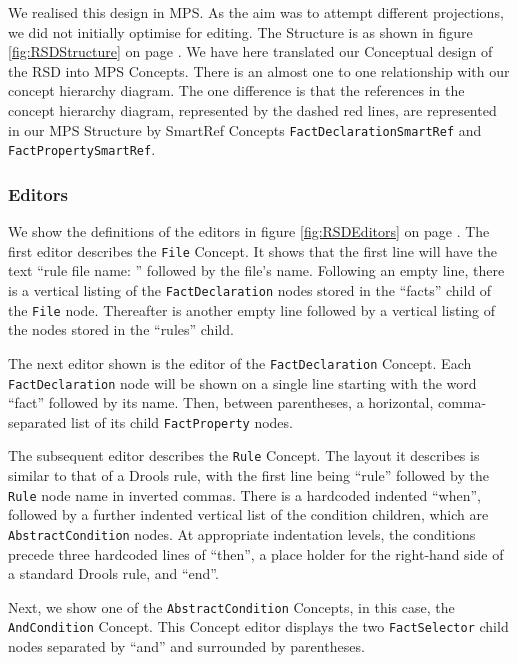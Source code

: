 We realised this design in MPS.
As the aim was to attempt different projections, we did not initially optimise for editing.
The Structure is as shown in figure \ref{fig:RSDStructure} on page \pageref{fig:RSDStructure}.
We have here translated our Conceptual design of the RSD into MPS Concepts.
There is an almost one to one relationship with our concept hierarchy diagram.
The one difference is that the references in the concept hierarchy diagram, represented by the dashed red lines, are represented in our MPS Structure by SmartRef Concepts \texttt{FactDeclarationSmartRef} and \texttt{FactPropertySmartRef}.


\subsubsection{Editors}

We show the definitions of the editors in figure \ref{fig:RSDEditors} on page \pageref{fig:RSDEditors}. 
The first editor describes the \texttt{File} Concept. 
It shows that the first line will have the text ``rule file name: '' followed by the file's name.
Following an empty line, there is a vertical listing of the \texttt{FactDeclaration} nodes stored in the ``facts'' child of the \texttt{File} node.
Thereafter is another empty line followed by a vertical listing of the  nodes stored in the ``rules'' child.

The next editor shown is the editor of the \texttt{FactDeclaration} Concept.
Each \texttt{FactDeclaration} node will be shown on a single line starting with the word ``fact'' followed by its name.
Then, between parentheses, a horizontal, comma-separated list of its child \texttt{FactProperty} nodes.

The subsequent editor describes the \texttt{Rule} Concept. 
The layout it describes is similar to that of a Drools rule, with the first line being ``rule'' followed by the \texttt{Rule} node name in inverted commas.
There is a hardcoded indented ``when'', followed by a further indented vertical list of the condition children, which are \linebreak\texttt{AbstractCondition} nodes.
At appropriate indentation levels, the conditions precede three hardcoded lines of ``then'', a place holder for the right-hand side of a standard Drools rule, and ``end''.

Next, we show one of the \texttt{AbstractCondition} Concepts, in this case, the \texttt{AndCondition} Concept.
This Concept editor displays the two \texttt{FactSelector} child nodes separated by ``and'' and surrounded by parentheses.

